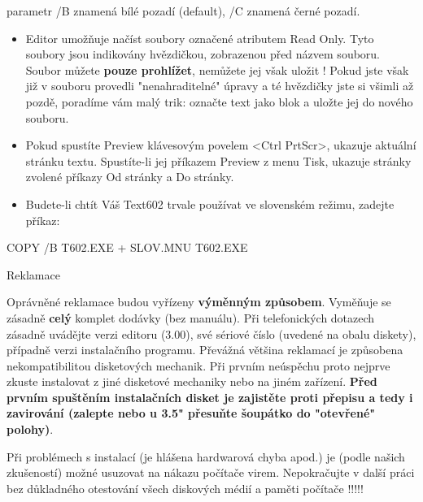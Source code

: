 \documentclass[11pt,a4paper]{article}
\begin{document}
parametr /B znamená bílé pozadí (default), /C znamená černé pozadí.

\begin{itemize}
\item Editor umožňuje načíst soubory označené atributem Read Only. Tyto soubory jsou indikovány hvězdičkou, zobrazenou před názvem souboru. Soubor můžete \textbf{pouze prohlížet}, nemůžete jej však uložit ! Pokud jste však již v souboru provedli "nenahraditelné" úpravy a té hvězdičky jste si všimli až pozdě, poradíme vám malý trik: označte text jako blok a uložte jej do nového souboru.
\item Pokud spustíte Preview klávesovým povelem <Ctrl PrtScr>, ukazuje aktuální stránku textu. Spustíte-li jej příkazem Preview z menu Tisk, ukazuje stránky zvolené příkazy Od stránky a Do stránky.
\item Budete-li chtít Váš Text602 trvale používat ve slovenském režimu, zadejte příkaz:
\end{itemize}

COPY /B T602.EXE + SLOV.MNU T602.EXE

Reklamace

Oprávněné reklamace budou vyřízeny \textbf{výměnným způsobem}. Vyměňuje se zásadně \textbf{celý} komplet dodávky (bez manuálu). Při telefonických dotazech zásadně uvádějte verzi editoru (3.00), své sériové číslo (uvedené na obalu diskety), případně verzi instalačního programu. Převážná většina reklamací je způsobena nekompatibilitou disketových mechanik. Při prvním neúspěchu proto nejprve zkuste instalovat z jiné disketové mechaniky nebo na jiném zařízení. \textbf{Před prvním spuštěním instalačních disket je zajistěte proti přepisu a tedy i zavirování (zalepte nebo u 3.5" přesuňte šoupátko do "otevřené" polohy)}.

Při problémech s instalací (je hlášena hardwarová chyba apod.) je (podle našich zkušeností) možné usuzovat na nákazu počítače virem. Nepokračujte v další práci bez důkladného otestování všech diskových médií a paměti počítače !!!!!
\end{document}
